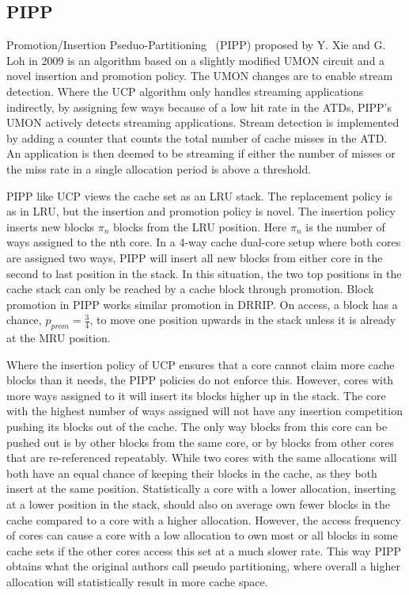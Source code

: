 
\subsection{PIPP}
\label{sec:algorithms:pipp}

Promotion/Insertion Pseduo-Partitioning~\cite{Xie2009} (PIPP) proposed by Y. Xie and G. Loh in 2009 is an algorithm based on a slightly modified UMON circuit and a novel insertion and promotion policy.
The UMON changes are to enable stream detection.
Where the UCP algorithm only handles streaming applications indirectly, by assigning few ways because of a low hit rate in the ATDs, PIPP's UMON actively detects streaming applications.
Stream detection is implemented by adding a counter that counts the total number of cache misses in the ATD.
An application is then deemed to be streaming if either the number of misses or the miss rate in a single allocation period is above a threshold.

PIPP like UCP views the cache set as an LRU stack.
The replacement policy is as in LRU, but the insertion and promotion policy is novel.
The insertion policy inserts new blocks $\pi_n$ blocks from the LRU position. 
Here $\pi_n$ is the number of ways assigned to the nth core.
In a 4-way cache dual-core setup where both cores are assigned two ways, PIPP will insert all new blocks from either core in the second to last position in the stack. 
In this situation, the two top positions in the cache stack can only be reached by a cache block through promotion.
Block promotion in PIPP works similar promotion in DRRIP. 
On access, a block has a chance, $p_{prom} = \frac{3}{4}$, to move one position upwards in the stack unless it is already at the MRU position.

Where the insertion policy of UCP ensures that a core cannot claim more cache blocks than it needs, the PIPP policies do not enforce this.
However, cores with more ways assigned to it will insert its blocks higher up in the stack. 
The core with the highest number of ways assigned will not have any insertion competition pushing its blocks out of the cache.
The only way blocks from this core can be pushed out is by other blocks from the same core, or by blocks from other cores that are re-referenced repeatably.
While two cores with the same allocations will both have an equal chance of keeping their blocks in the cache, as they both insert at the same position.
Statistically a core with a lower allocation, inserting at a lower position in the stack, should also on average own fewer blocks in the cache compared to a core with a higher allocation.
However, the access frequency of cores can cause a core with a low allocation to own most or all blocks in some cache sets if the other cores access this set at a much slower rate.
This way PIPP obtains what the original authors call pseudo partitioning, where overall a higher allocation will statistically result in more cache space.

